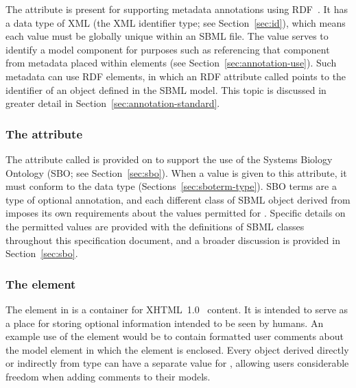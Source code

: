 The  attribute is present for supporting metadata
annotations using RDF~\citep[Resource Description
Format;][]{lassila:1999}.  It has a data type of XML 
(the XML identifier type; see Section~\ref{sec:id}), which means each  value
must be globally unique within an SBML file.  The 
value serves to identify a model component for purposes such as
referencing that component from metadata placed within
 elements (see
Section~\ref{sec:annotation-use}).  Such metadata can use RDF
 elements, in which an RDF attribute called
 points to the  identifier of an
object defined in the SBML model.  This topic is discussed in
greater detail in Section~\ref{sec:annotation-standard}.


\subsubsection{The  attribute}
\label{sec:sbase-sboterm}

The attribute called  is provided on \SBase to support
the use of the Systems Biology Ontology (SBO; see
Section~\ref{sec:sbo}).  When a value is
given to this attribute, it must conform to the data type
 (Sections~\ref{sec:sboterm-type}).  SBO terms
are a type of optional annotation, and each different class of
SBML object derived from \SBase imposes its own requirements about
the values permitted for .  Specific details on the
permitted values are provided with the definitions of SBML classes
throughout this specification document, and a broader discussion
is provided in Section~\ref{sec:sbo}.


\subsubsection{The  element}
\label{sec:notes}

The element  in \SBase is a container for
XHTML~1.0~\citep{pemberton:2002} content.  It is intended to serve
as a place for storing optional information intended to be seen by
humans.  An example use of the  element would be to
contain formatted user comments about the model element in which
the  element is enclosed.  Every object derived
directly or indirectly from type \SBase can have a separate value
for , allowing users considerable freedom when adding
comments to their models.

